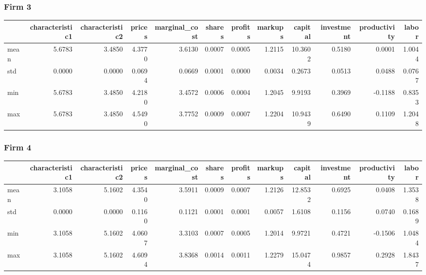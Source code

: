  \subsubsection*{Firm 3}
\begin{tabular}{lrrrrrrrrrrr}
\toprule
{} &  characteristic1 &  characteristic2 &  prices &  marginal\_cost &  shares &  profits &  markups &  capital &  investment &  productivity &  labor \\
\midrule
mean &           5.6783 &           3.4850 &  4.3770 &         3.6130 &  0.0007 &   0.0005 &   1.2115 &  10.3602 &      0.5180 &        0.0001 & 1.0044 \\
std  &           0.0000 &           0.0000 &  0.0694 &         0.0669 &  0.0001 &   0.0000 &   0.0034 &   0.2673 &      0.0513 &        0.0488 & 0.0767 \\
min  &           5.6783 &           3.4850 &  4.2180 &         3.4572 &  0.0006 &   0.0004 &   1.2045 &   9.9193 &      0.3969 &       -0.1188 & 0.8353 \\
max  &           5.6783 &           3.4850 &  4.5490 &         3.7752 &  0.0009 &   0.0007 &   1.2204 &  10.9439 &      0.6490 &        0.1109 & 1.2048 \\
\bottomrule
\end{tabular}


 \subsubsection*{Firm 4}
\begin{tabular}{lrrrrrrrrrrr}
\toprule
{} &  characteristic1 &  characteristic2 &  prices &  marginal\_cost &  shares &  profits &  markups &  capital &  investment &  productivity &  labor \\
\midrule
mean &           3.1058 &           5.1602 &  4.3540 &         3.5911 &  0.0009 &   0.0007 &   1.2126 &  12.8532 &      0.6925 &        0.0408 & 1.3538 \\
std  &           0.0000 &           0.0000 &  0.1160 &         0.1121 &  0.0001 &   0.0001 &   0.0057 &   1.6108 &      0.1156 &        0.0740 & 0.1689 \\
min  &           3.1058 &           5.1602 &  4.0607 &         3.3103 &  0.0007 &   0.0005 &   1.2014 &   9.9721 &      0.4721 &       -0.1506 & 1.0484 \\
max  &           3.1058 &           5.1602 &  4.6094 &         3.8368 &  0.0014 &   0.0011 &   1.2279 &  15.0474 &      0.9857 &        0.2928 & 1.8437 \\
\bottomrule
\end{tabular}


